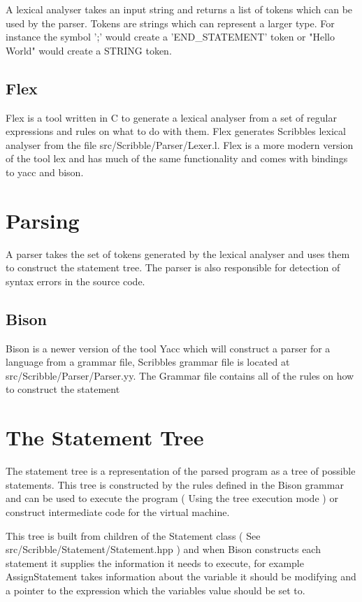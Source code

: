 \documentclass[]{final_report}
\begin{document}
A lexical analyser takes an input string and returns a list of tokens which can be used by the parser. Tokens are strings which can represent a larger type. For instance the symbol ';' would create a 'END\_STATEMENT' token or "Hello World" would create a STRING token.

\subsection{Flex}

Flex is a tool written in C to generate a lexical analyser from a set of regular expressions and rules on what to do with them. Flex generates Scribbles lexical analyser from the file src/Scribble/Parser/Lexer.l. Flex is a more modern version of the tool lex and has much of the same functionality and comes with bindings to yacc and bison.

\section{Parsing}

A parser takes the set of tokens generated by the lexical analyser and uses them to construct the statement tree. The parser is also responsible for detection of syntax errors in the source code.

\subsection{Bison}

Bison is a newer version of the tool Yacc which will construct a parser for a language from a grammar file, Scribbles grammar file is located at src/Scribble/Parser/Parser.yy. The Grammar file contains all of the rules on how to construct the statement 

\section{The Statement Tree}

The statement tree is a representation of the parsed program as a tree of possible statements. This tree is constructed by the rules defined in the Bison grammar and can be used to execute the program ( Using the tree execution mode ) or construct intermediate code for the virtual machine.

This tree is built from children of the Statement class ( See src/Scribble/Statement/Statement.hpp ) and when Bison constructs each statement it supplies the information it needs to execute, for example AssignStatement takes information about the variable it should be modifying and a pointer to the expression which the variables value should be set to.
\end{document}
